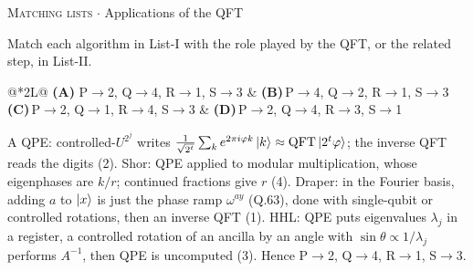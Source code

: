 \documentclass[11pt,a4paper]{article}
\newcommand{\optlabel}[1]{\textbf{(#1)}}
\newcommand{\correctlabel}[1]{\textcolor{okgreen}{\textbf{(#1)}\,\ding{51}}}
\newenvironment{qitem}[1]{\begin{list}{}{\setlength{\leftmargin}{3.3em}\setlength{\labelwidth}{3.1em}%
  \setlength{\labelsep}{0.2em}\setlength{\topsep}{3pt}\setlength{\parsep}{3pt}}\item[\textbf{Q.#1}\hfill]}{\end{list}}
\newcommand{\qsep}{\par\vspace{2pt}{\color{black!15}\hrule}\vspace{4pt}}
\newcommand{\qmeta}[2]{{\footnotesize\color{black!60}\textsc{#1} \;$\cdot$\; #2}\par}
\begin{document}
\begin{qitem}{75}
\qmeta{Matching lists}{Applications of the QFT}
Match each algorithm in List-I with the role played by the QFT, or the related step, in List-II.
\par\smallskip{}
\par\smallskip\noindent\begin{tabularx}{\linewidth}{@{}*{2}{L}@{}}
\correctlabel{A}\,P$\to$2, Q$\to$4, R$\to$1, S$\to$3 & \optlabel{B}\,P$\to$4, Q$\to$2, R$\to$1, S$\to$3 \\[3pt]
\optlabel{C}\,P$\to$2, Q$\to$1, R$\to$4, S$\to$3 & \optlabel{D}\,P$\to$2, Q$\to$4, R$\to$3, S$\to$1
\end{tabularx}
\end{qitem}
\begin{solbox}{A}
QPE: controlled-$U^{2^j}$ writes $\frac{1}{\sqrt{2^t}}\sum_k e^{2\pi i\varphi k}\ket k \approx \mathrm{QFT}\ket{2^t\varphi}$; the inverse QFT reads
the digits (2). Shor: QPE applied to modular multiplication, whose eigenphases are $k/r$; continued fractions give $r$ (4).
Draper: in the Fourier basis, adding $a$ to $\ket{x}$ is just the phase ramp $\omega^{ay}$ (Q.63), done with single-qubit or
controlled rotations, then an inverse QFT (1). HHL: QPE puts eigenvalues $\lambda_j$ in a register, a controlled rotation
of an ancilla by an angle with $\sin\theta \propto 1/\lambda_j$ performs $A^{-1}$, then QPE is uncomputed (3).
Hence P$\to$2, Q$\to$4, R$\to$1, S$\to$3.
\end{solbox}
\qsep
\end{document}
